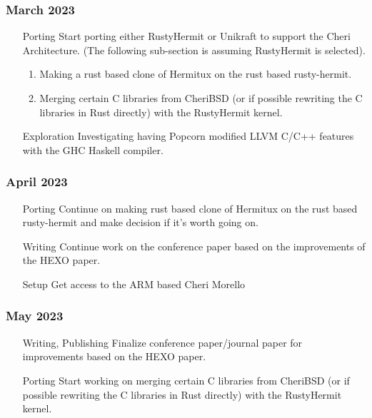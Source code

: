   \subsubsection{March 2023}
  \begin{enumerate}
    \item [Porting] Start porting either RustyHermit or Unikraft to support the Cheri Architecture. (The following sub-section is assuming 
          RustyHermit is selected).
          \begin{enumerate}
            \item Making a rust based clone of Hermitux on the rust based rusty-hermit. 
            \item Merging certain C libraries from CheriBSD (or if possible rewriting the C libraries in Rust directly) 
            with the RustyHermit kernel. 
          \end{enumerate}
    \item [Exploration] Investigating having Popcorn modified LLVM C/C++ features with the GHC Haskell compiler. 
  \end{enumerate}

  \subsubsection{April 2023}
  \begin{enumerate}
    \item [Porting] Continue on making rust based clone of Hermitux on the rust based rusty-hermit and make decision if it's worth going on.
    \item [Writing] Continue work on the conference paper based on the improvements of the HEXO paper.
    \item [Setup] Get access to the ARM based Cheri Morello
  \end{enumerate}

  \subsubsection{May 2023}
  \begin{enumerate}
     \item [Writing, Publishing] Finalize conference paper/journal paper for improvements based on the HEXO paper.
     \item [Porting] Start working on merging certain C libraries from CheriBSD (or if possible rewriting the C libraries in Rust directly) 
     with the RustyHermit kernel.
  \end{enumerate}


